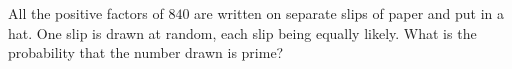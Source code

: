 All the positive factors of $840$ are written on separate slips of paper and put in a hat. One slip is drawn at random, each slip being equally likely. What is the probability that the number drawn is prime?

